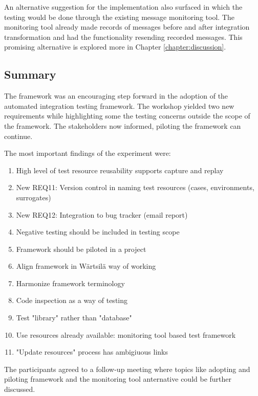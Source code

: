 \documentclass[12pt,a4paper,oneside,pdftex]{report}
\begin{document}
{An alternative suggestion for the implementation also surfaced in which the testing would be done through the existing message monitoring tool. The monitoring tool already made records of messages before and after integration transformation and had the functionality resending recorded messages. This promising alternative is explored more in Chapter \ref{chapter:discussion}.

\subsection{Summary}

The framework was an encouraging step forward in the adoption of the automated integration testing framework. The workshop yielded two new requirements while highlighting some the testing concerns outside the scope of the framework. The stakeholders now informed, piloting the framework can continue.

The most important findings of the experiment were:
\begin{enumerate}

\item High level of test resource reusability supports capture and replay
\item New REQ11: Version control in naming test resources (cases, environments, surrogates)
\item New REQ12: Integration to bug tracker (email report)
\item Negative testing should be included in testing scope
\item Framework should be piloted in a project
\item Align framework in Wärtsilä way of working
\item Harmonize framework terminology
\item Code inspection as a way of testing
\item Test "library" rather than "database"
\item Use resources already available: monitoring tool based test framework
\item "Update resources" process has ambigiuous links
\end{enumerate}

The participants agreed to a follow-up meeting where topics like adopting and piloting framework and the monitoring tool anternative could be further discussed.

}
\end{document}
